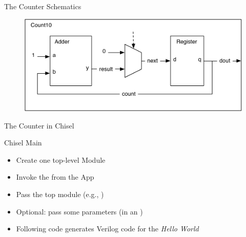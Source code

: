 \begin{frame}[fragile]{The Counter Schematics}
\begin{figure}
  \includegraphics[scale=0.6]{../figures/components-counter}
\end{figure}
\end{frame}

\begin{frame}[fragile]{The Counter in Chisel}
\end{frame}

%



\begin{frame}[fragile]{Chisel Main}

\begin{itemize}
\item Create one top-level Module
\item Invoke the  from the App
\item Pass the top module (e.g., )
\item Optional: pass some parameters (in an )
\item Following code generates Verilog code for the \emph{Hello World}
\end{itemize}
\end{frame}



